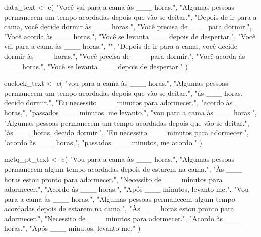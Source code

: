 \documentclass[
  12pt,
  a4paper,
  oneside]{tesesusp}
\newenvironment{Shaded}{\begin{snugshade}}{\end{snugshade}}
\newcommand{\FunctionTok}[1]{\textcolor[rgb]{0.28,0.35,0.67}{#1}}
\newcommand{\NormalTok}[1]{\textcolor[rgb]{0.00,0.23,0.31}{#1}}
\newcommand{\OtherTok}[1]{\textcolor[rgb]{0.00,0.23,0.31}{#1}}
\newcommand{\StringTok}[1]{\textcolor[rgb]{0.13,0.47,0.30}{#1}}
\begin{document}
\begin{Shaded}
\begin{Highlighting}[numbers=left,,]
\NormalTok{data\_text }\OtherTok{\textless{}{-}} \FunctionTok{c}\NormalTok{(}
  \StringTok{"Você vai para a cama às \_\_\_ horas."}\NormalTok{,}
  \StringTok{"Algumas pessoas permanecem um tempo acordadas depois que vão se deitar."}\NormalTok{,}
  \StringTok{"Depois de ir para a cama, você decide dormir às \_\_\_ horas."}\NormalTok{,}
  \StringTok{"Você precisa de \_\_\_ para dormir."}\NormalTok{,}
  \StringTok{"Você acorda às \_\_\_ horas."}\NormalTok{,}
  \StringTok{"Você se levanta \_\_\_ depois de despertar."}\NormalTok{,}
  \StringTok{"Você vai para a cama às \_\_\_ horas."}\NormalTok{,}
  \StringTok{""}\NormalTok{,}
  \StringTok{"Depois de ir para a cama, você decide dormir às \_\_\_ horas."}\NormalTok{,}
  \StringTok{"Você precisa de \_\_\_ para dormir."}\NormalTok{,}
  \StringTok{"Você acorda às \_\_\_ horas."}\NormalTok{,}
  \StringTok{"Você se levanta \_\_\_ depois de despertar."}
\NormalTok{)}

\NormalTok{euclock\_text }\OtherTok{\textless{}{-}} \FunctionTok{c}\NormalTok{(}
  \StringTok{"vou para a cama às \_\_\_ horas."}\NormalTok{,}
  \StringTok{"Algumas pessoas permanecem um tempo acordadas depois que vão se deitar."}\NormalTok{,}
  \StringTok{"às \_\_\_ horas, decido dormir."}\NormalTok{,}
  \StringTok{"Eu necessito \_\_\_ minutos para adormecer."}\NormalTok{,}
  \StringTok{"acordo às \_\_\_ horas,"}\NormalTok{,}
  \StringTok{"passados \_\_\_ minutos, me levanto."}\NormalTok{,}
  \StringTok{"vou para a cama às \_\_\_ horas."}\NormalTok{,}
  \StringTok{"Algumas pessoas permanecem um tempo acordadas depois que vão se deitar."}\NormalTok{,}
  \StringTok{"às \_\_\_ horas, decido dormir."}\NormalTok{,}
  \StringTok{"Eu necessito \_\_\_ minutos para adormecer."}\NormalTok{,}
  \StringTok{"acordo às \_\_\_ horas,"}\NormalTok{,}
  \StringTok{"passados \_\_\_ minutos, me acordo."}
\NormalTok{)}

\NormalTok{mctq\_pt\_text }\OtherTok{\textless{}{-}} \FunctionTok{c}\NormalTok{(}
  \StringTok{"Vou para a cama às \_\_\_ horas."}\NormalTok{,}
  \StringTok{"Algumas pessoas permanecem algum tempo acordadas depois de estarem na cama."}\NormalTok{,}
  \StringTok{"Às \_\_\_ horas estou pronto para adormecer."}\NormalTok{,}
  \StringTok{"Necessito de \_\_\_ minutos para adormecer."}\NormalTok{,}
  \StringTok{"Acordo às \_\_\_ horas."}\NormalTok{,}
  \StringTok{"Após \_\_\_ minutos, levanto{-}me."}\NormalTok{,}
  \StringTok{"Vou para a cama às \_\_\_ horas."}\NormalTok{,}
  \StringTok{"Algumas pessoas permanecem algum tempo acordadas depois de estarem na cama."}\NormalTok{,}
  \StringTok{"Às \_\_\_ horas estou pronto para adormecer."}\NormalTok{,}
  \StringTok{"Necessito de \_\_\_ minutos para adormecer."}\NormalTok{,}
  \StringTok{"Acordo às \_\_\_ horas."}\NormalTok{,}
  \StringTok{"Após \_\_\_ minutos, levanto{-}me."}
\NormalTok{)}
\end{Highlighting}
\end{Shaded}
\end{document}

